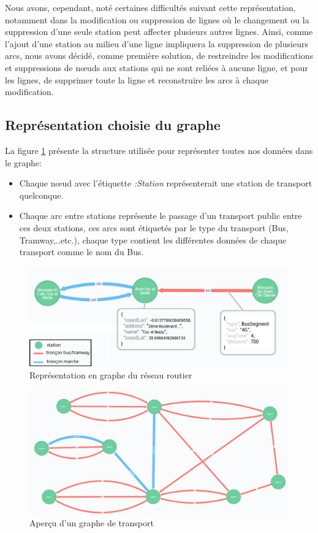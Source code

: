 \begin{itemize}
	Nous avons, cependant, noté certaines difficultés suivant cette représentation, notamment dans la modification ou suppression de lignes où le changement ou la suppression d'une seule station peut affecter plusieurs autres lignes.\newline
	Ainsi, comme l'ajout d'une station au milieu d'une ligne impliquera la suppression de plusieurs arcs, nous avons décidé, comme première solution, de restreindre les modifications et suppressions de nœuds aux stations qui ne sont reliées à aucune ligne, et pour les lignes, de supprimer toute la ligne et reconstruire les arcs à chaque modification.
	     
\end{itemize}
\subsection{Représentation choisie du graphe}
La figure \ref{fig:structGraph} présente la structure utilisée pour représenter toutes nos données dans le graphe:
\begin{itemize}
	\item Chaque nœud avec l'étiquette \emph{:Station} représenterait une station de transport quelconque.
	\item Chaque arc entre stations représente le passage d'un transport public entre ces deux stations, ces arcs sont étiquetés par le type du transport (Bus, Tramway,..etc.), chaque type contient les différentes données de chaque transport comme le nom du Bus.
\end{itemize}

\begin{figure}[h!]
	\center
	\includegraphics[width=\textwidth]{img/structureGraphe.png}
	\caption{Représentation en graphe du réseau routier}
	\label{fig:structGraph}
\end{figure}

\begin{figure}[h!]
	\center
	\includegraphics[width=\textwidth]{img/GrapheNeo4j.png}
	\caption{Aperçu d'un graphe de transport}
\end{figure}

